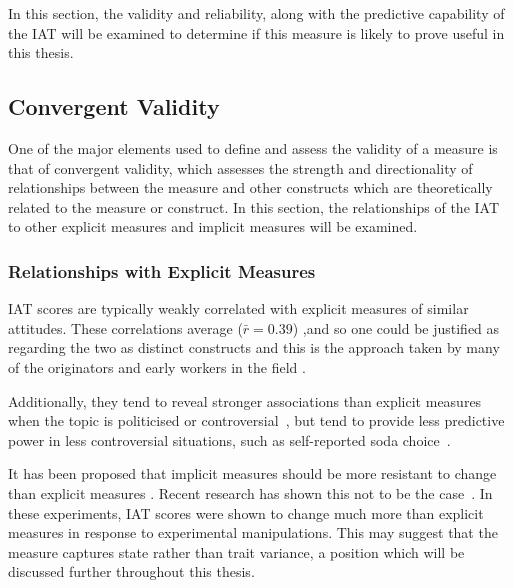 In this section, the validity and reliability, along with the predictive capability of the IAT will be examined to determine if this measure is likely to prove useful in this thesis. 

\subsection{Convergent Validity}
\label{sec:convergent-validity}

One of the major elements used to define and assess the validity of a measure is that of convergent validity, which assesses the strength and directionality of relationships between the measure and other constructs which are theoretically related to the measure or construct. In this section, the relationships of the IAT to other explicit measures and implicit measures will be examined. 


\subsubsection{Relationships with Explicit Measures}
\label{sec:relat-with-expl}



IAT scores are typically weakly correlated with explicit measures of similar attitudes. These correlations average ($\bar r=0.39$) \cite{Nosek2005},and so one could be justified as regarding the two as distinct constructs \cite{Nosek2007a} and this is the approach taken by many of the originators and early workers in the field \cite{Greenwald2000,Nosek2007a}. 

Additionally, they tend to reveal stronger associations than explicit measures when the topic is politicised or controversial~\cite{Greenwald2009}, but tend to provide less predictive power in less controversial situations, such as self-reported soda choice~\cite{Karpinski2006}.


It has been proposed that implicit measures should be more resistant to change than explicit measures \cite{Greenwald1995a,Greenwald1998}. Recent research has shown this not to be the case~\cite{Meagher2004,Gschwendner2008}. In these experiments, IAT scores were shown to change much more than explicit measures in response to experimental manipulations. This may suggest that the measure captures state rather than trait variance, a position which will be discussed further throughout this thesis. 


